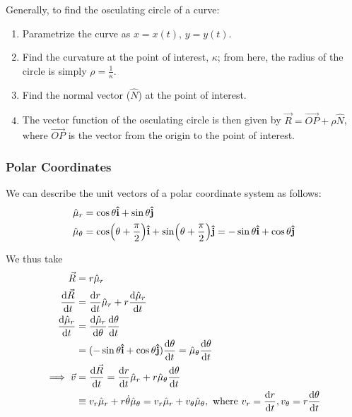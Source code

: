 \documentclass[12pt]{article}
\begin{document}
{Generally, to find the osculating circle of a curve:
\begin{enumerate}
    \item Parametrize the curve as $x = x(t)$, $y = y(t)$.
    \item Find the curvature at the point of interest, $\kappa$; from here, the radius of the circle is simply $\rho = \frac{1}{\kappa}$.
    \item Find the normal vector ($\hat{N}$) at the point of interest.
    \item The vector function of the osculating circle is then given by $\vec{R} = \vec{OP} + \rho \hat{N}$, where $\vec{OP}$ is the vector from the origin to the point of interest.
\end{enumerate}

\subsubsection{Polar Coordinates}

We can describe the unit vectors of a polar coordinate system as follows: \begin{align*}
    \hat{\mu}_r &= \cos \theta \vu{i} + \sin \theta \vu{j}\\
    \hat{\mu}_\theta &= \cos (\theta + \frac{\pi}{2}) \vu{i} + \sin (\theta + \frac{\pi}{2}) \vu{j} = - \sin \theta \vu{i} + \cos \theta \vu{j}\\
\end{align*}

We thus take \begin{align*}
    \vec{R} &= r \hat{\mu}_r\\
    \frac{\text{d}\vec{R}}{\text{d}t} &= \frac{\text{d}r}{\text{d}t} \hat{\mu}_r + r\frac{\text{d}\hat{\mu}_r}{\text{d}t}\\
    \frac{\text{d}\hat{\mu}_r}{\text{d}t} &= \frac{\text{d}\hat{\mu}_r}{\text{d}\theta}\frac{\text{d}\theta}{\text{d}t}\\
    &= (-\sin \theta \vu{i} + \cos \theta \vu{j}) \frac{\text{d}\theta}{\text{d}t} = \hat{\mu}_\theta \frac{\text{d}\theta}{\text{d}t}\\
    \implies \vec{v} &= \frac{\text{d}\vec{R}}{\text{d}t} = \frac{\text{d}r}{\text{d}t} \hat{\mu}_r + r \hat{\mu}_\theta \frac{\text{d}\theta}{\text{d}t}\\
    &\equiv v_r \hat{\mu}_r + r \dot{\theta} \hat{\mu}_\theta = v_r \hat{\mu}_r + v_\theta \hat{\mu}_\theta, \text{ where } v_r = \frac{\text{d}r}{\text{d}t}, v_\theta = r \frac{\text{d}\theta}{\text{d}t}\\
\end{align*}

}
\end{document}
